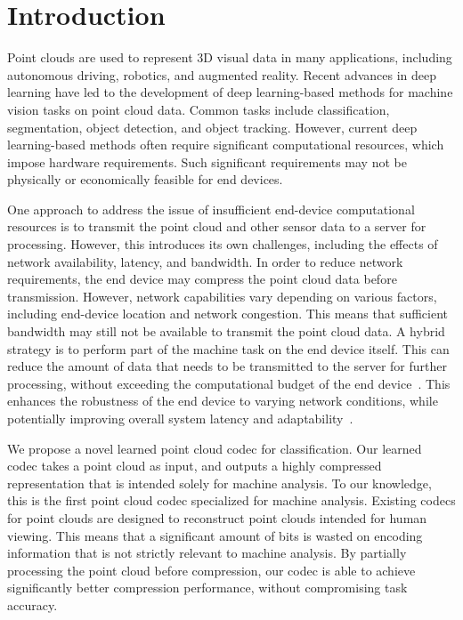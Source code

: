 \section{Introduction}
\label{sec:introduction}

Point clouds are used to represent 3D visual data in many applications, including autonomous driving, robotics, and augmented reality.
Recent advances in deep learning have led to the development of deep learning-based methods for machine vision tasks on point cloud data.
Common tasks include classification, segmentation, object detection, and object tracking.
However, current deep learning-based methods often require significant computational resources, which impose hardware requirements.
Such significant requirements may not be physically or economically feasible for end devices.

One approach to address the issue of insufficient end-device computational resources is to transmit the point cloud and other sensor data to a server for processing.
However, this introduces its own challenges, including the effects of network availability, latency, and bandwidth.
In order to reduce network requirements, the end device may compress the point cloud data before transmission.
However, network capabilities vary depending on various factors, including end-device location and network congestion.
This means that sufficient bandwidth may still not be available to transmit the point cloud data.
A hybrid strategy is to perform part of the machine task on the end device itself.
This can reduce the amount of data that needs to be transmitted to the server for further processing, without exceeding the computational budget of the end device~\cite{kang2017neurosurgeon}.
This enhances the robustness of the end device to varying network conditions, while potentially improving overall system latency and adaptability~\cite{shlezinger2022IOTM}.

We propose a novel learned point cloud codec for classification.
Our learned codec takes a point cloud as input, and outputs a highly compressed representation that is intended solely for machine analysis.
To our knowledge, this is the first point cloud codec specialized for machine analysis.
Existing codecs for point clouds are designed to reconstruct point clouds intended for human viewing.
This means that a significant amount of bits is wasted on encoding information that is not strictly relevant to machine analysis.
By partially processing the point cloud before compression, our codec is able to achieve significantly better compression performance, without compromising task accuracy.

